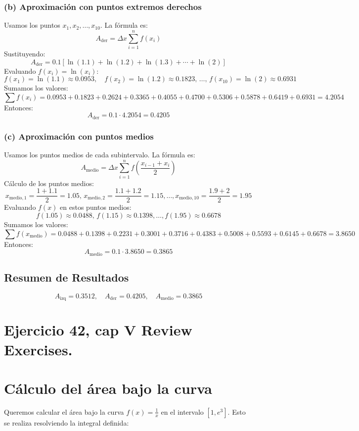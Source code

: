 \documentclass[11pt,letterpaper]{article}
\begin{document}
\subsubsection*{(b) Aproximación con puntos extremos derechos}
Usamos los puntos \(x_1, x_2, \dots, x_{10}\). La fórmula es:
\[
A_{\text{der}} = \Delta x \sum_{i=1}^{n} f(x_i)
\]
Sustituyendo:
\[
A_{\text{der}} = 0.1 \left[ \ln(1.1) + \ln(1.2) + \ln(1.3) + \cdots + \ln(2) \right]
\]
Evaluando \(f(x_i) = \ln(x_i)\):
\[
f(x_1) = \ln(1.1) \approx 0.0953, \quad f(x_2) = \ln(1.2) \approx 0.1823, \, \dots, \, f(x_{10}) = \ln(2) \approx 0.6931
\]
Sumamos los valores:
\[
\sum f(x_i) = 0.0953 + 0.1823 + 0.2624 + 0.3365 + 0.4055 + 0.4700 + 0.5306 + 0.5878 + 0.6419 + 0.6931 = 4.2054
\]
Entonces:
\[
A_{\text{der}} = 0.1 \cdot 4.2054 = 0.4205
\]

\subsubsection*{(c) Aproximación con puntos medios}
Usamos los puntos medios de cada subintervalo. La fórmula es:
\[
A_{\text{medio}} = \Delta x \sum_{i=1}^{n} f\left(\frac{x_{i-1} + x_i}{2}\right)
\]
Cálculo de los puntos medios:
\[
x_{\text{medio},1} = \frac{1 + 1.1}{2} = 1.05, \, x_{\text{medio},2} = \frac{1.1 + 1.2}{2} = 1.15, \dots, x_{\text{medio},10} = \frac{1.9 + 2}{2} = 1.95
\]
Evaluando \(f(x)\) en estos puntos medios:
\[
f(1.05) \approx 0.0488, \, f(1.15) \approx 0.1398, \dots, f(1.95) \approx 0.6678
\]
Sumamos los valores:
\[
\sum f(x_{\text{medio}}) = 0.0488 + 0.1398 + 0.2231 + 0.3001 + 0.3716 + 0.4383 + 0.5008 + 0.5593 + 0.6145 + 0.6678 = 3.8650
\]
Entonces:
\[
A_{\text{medio}} = 0.1 \cdot 3.8650 = 0.3865
\]

\subsection*{Resumen de Resultados}
\[
A_{\text{izq}} = 0.3512, \quad A_{\text{der}} = 0.4205, \quad A_{\text{medio}} = 0.3865
\]


\section{Ejercicio 42, cap V Review Exercises.}
\section*{Cálculo del área bajo la curva}

Queremos calcular el área bajo la curva \(f(x) = \frac{1}{x}\) en el intervalo \([1, e^3]\). Esto se realiza resolviendo la integral definida:
\end{document}
